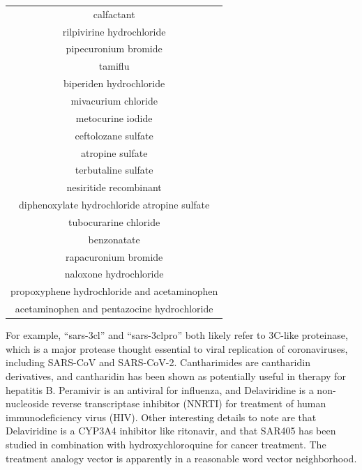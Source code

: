 \documentclass{article}
\begin{document}
\begin{table}[t!]
\begin{tabular}[t]{c}
calfactant \\
rilpivirine hydrochloride \\
pipecuronium bromide \\
tamiflu \\
biperiden hydrochloride \\
mivacurium chloride \\
metocurine iodide \\
ceftolozane sulfate \\
atropine sulfate \\
terbutaline sulfate \\
nesiritide recombinant \\
diphenoxylate hydrochloride atropine sulfate \\
tubocurarine chloride \\
benzonatate \\
rapacuronium bromide \\
naloxone hydrochloride \\
propoxyphene hydrochloride and acetaminophen \\
acetaminophen and pentazocine hydrochloride \\
\hline
\end{tabular}
\end{table}

For example, ``sars-3cl'' and ``sars-3clpro'' both likely refer to 3C-like proteinase, which is a major protease thought essential to viral replication of coronaviruses, including SARS-CoV and SARS-CoV-2\cite{goetz2007substrate,zhang2020crystal}.
Cantharimides are cantharidin derivatives, and cantharidin has been shown as potentially useful in therapy for hepatitis B\cite{romero2007effect}.
Peramivir is an antiviral for influenza, and Delaviridine is a non-nucleoside reverse transcriptase inhibitor (NNRTI) for treatment of human immunodeficiency virus (HIV).
Other interesting details to note are that Delaviridine is a CYP3A4 inhibitor\cite{famil2006guidelines} like ritonavir, and that SAR405 has been studied in combination with hydroxychloroquine for cancer treatment\cite{shi2017research}.
The treatment analogy vector is apparently in a reasonable word vector neighborhood.
\end{document}
